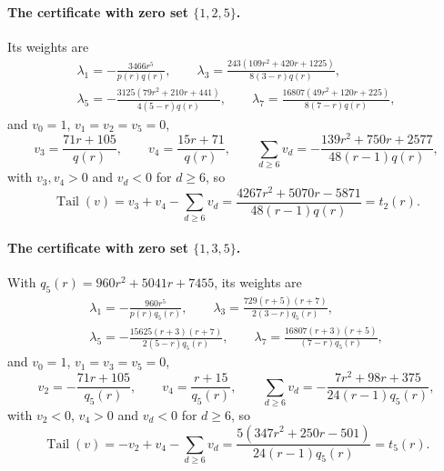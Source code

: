 \documentclass[11pt]{article}
\DeclareMathOperator{\Tail}{Tail}
\begin{document}
\paragraph{The certificate with zero set $\{1,2,5\}$.}  Its weights are
\begin{gather*}
  \lambda_1=-\frac{3466r^5}{p(r)q(r)},\qquad
  \lambda_3=\frac{243(109r^2+420r+1225)}{8(3-r)q(r)},\\
  \lambda_5=-\frac{3125(79r^2+210r+441)}{4(5-r)q(r)},\qquad
  \lambda_7=\frac{16807(49r^2+120r+225)}{8(7-r)q(r)},
\end{gather*}
and $v_0=1$, $v_1=v_2=v_5=0$,
\[
  v_3=\frac{71r+105}{q(r)},\qquad
  v_4=\frac{15r+71}{q(r)},\qquad
  \sum_{d\ge6}v_d=-\frac{139r^2+750r+2577}{48(r-1)q(r)},
\]
with $v_3,v_4>0$ and $v_d<0$ for $d\ge6$, so
\[
  \Tail(v)=v_3+v_4-\sum_{d\ge6}v_d
  =\frac{4267r^2+5070r-5871}{48(r-1)q(r)}=t_2(r).
\]

\paragraph{The certificate with zero set $\{1,3,5\}$.}  With
$q_5(r)=960r^2+5041r+7455$, its weights are
\begin{gather*}
  \lambda_1=-\frac{960r^5}{p(r)q_5(r)},\qquad
  \lambda_3=\frac{729(r+5)(r+7)}{2(3-r)q_5(r)},\\
  \lambda_5=-\frac{15625(r+3)(r+7)}{2(5-r)q_5(r)},\qquad
  \lambda_7=\frac{16807(r+3)(r+5)}{(7-r)q_5(r)},
\end{gather*}
and $v_0=1$, $v_1=v_3=v_5=0$,
\[
  v_2=-\frac{71r+105}{q_5(r)},\qquad
  v_4=\frac{r+15}{q_5(r)},\qquad
  \sum_{d\ge6}v_d=-\frac{7r^2+98r+375}{24(r-1)q_5(r)},
\]
with $v_2<0$, $v_4>0$ and $v_d<0$ for $d\ge6$, so
\[
  \Tail(v)=-v_2+v_4-\sum_{d\ge6}v_d
  =\frac{5(347r^2+250r-501)}{24(r-1)q_5(r)}=t_5(r).
\]
\end{document}
